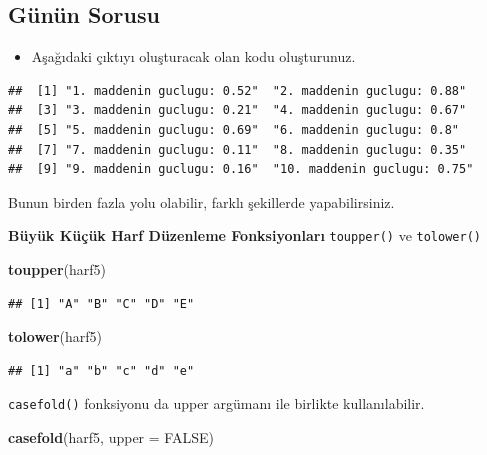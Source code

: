\documentclass[
  oneside]{book}
\newenvironment{Shaded}{\begin{snugshade}}{\end{snugshade}}
\newcommand{\AttributeTok}[1]{\textcolor[rgb]{0.13,0.29,0.53}{#1}}
\newcommand{\ConstantTok}[1]{\textcolor[rgb]{0.56,0.35,0.01}{#1}}
\newcommand{\FunctionTok}[1]{\textcolor[rgb]{0.13,0.29,0.53}{\textbf{#1}}}
\newcommand{\NormalTok}[1]{#1}
\providecommand{\tightlist}{%
  \setlength{\itemsep}{0pt}\setlength{\parskip}{0pt}}
\begin{document}
\hypertarget{guxfcnuxfcn-sorusu}{%
\subsection{Günün Sorusu}\label{guxfcnuxfcn-sorusu}}

\begin{itemize}
\tightlist
\item
  Aşağıdaki çıktıyı oluşturacak olan kodu oluşturunuz.
\end{itemize}

\begin{verbatim}
##  [1] "1. maddenin guclugu: 0.52"  "2. maddenin guclugu: 0.88" 
##  [3] "3. maddenin guclugu: 0.21"  "4. maddenin guclugu: 0.67" 
##  [5] "5. maddenin guclugu: 0.69"  "6. maddenin guclugu: 0.8"  
##  [7] "7. maddenin guclugu: 0.11"  "8. maddenin guclugu: 0.35" 
##  [9] "9. maddenin guclugu: 0.16"  "10. maddenin guclugu: 0.75"
\end{verbatim}

Bunun birden fazla yolu olabilir, farklı şekillerde yapabilirsiniz.

\textbf{Büyük Küçük Harf Düzenleme Fonksiyonları} \texttt{toupper()} ve \texttt{tolower()}

\begin{Shaded}
\begin{Highlighting}[]
\FunctionTok{toupper}\NormalTok{(harf5)}
\end{Highlighting}
\end{Shaded}

\begin{verbatim}
## [1] "A" "B" "C" "D" "E"
\end{verbatim}

\begin{Shaded}
\begin{Highlighting}[]
\FunctionTok{tolower}\NormalTok{(harf5)}
\end{Highlighting}
\end{Shaded}

\begin{verbatim}
## [1] "a" "b" "c" "d" "e"
\end{verbatim}

\texttt{casefold()} fonksiyonu da upper argümanı ile birlikte kullanılabilir.

\begin{Shaded}
\begin{Highlighting}[]
\FunctionTok{casefold}\NormalTok{(harf5, }\AttributeTok{upper =} \ConstantTok{FALSE}\NormalTok{)}
\end{Highlighting}
\end{Shaded}
\end{document}
